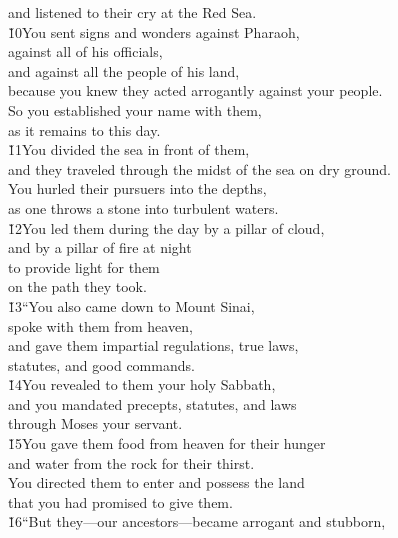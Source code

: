 \begin{poetry}
\poemll    and listened to their cry at the Red Sea. \\
\poeml \v{10}You sent signs and wonders against Pharaoh, \\
\poemll    against all of his officials, \\
\poeml and against all the people of his land, \\
\poemll    because you knew they acted arrogantly against your people. \\
\poeml So you established your name with them, \\
\poemll    as it remains to this day. \\
\poeml \v{11}You divided the sea in front of them, \\
\poemll    and they traveled through the midst of the sea on dry ground. \\
\poeml You hurled their pursuers into the depths, \\
\poemll    as one throws a stone into turbulent waters. \\
\poeml \v{12}You led them during the day by a pillar of cloud, \\
\poemll    and by a pillar of fire at night \\
\poeml to provide light for them \\
\poemll    on the path they took. \\
\poeml \v{13}``You also came down to Mount Sinai, \\
\poemll    spoke with them from heaven, \\
\poeml and gave them impartial regulations, true laws, \\
\poemll    statutes, and good commands. \\
\poeml \v{14}You revealed to them your holy Sabbath, \\
\poemll    and you mandated precepts, statutes, and laws \\
\poemlll       through Moses your servant. \\
\poeml \v{15}You gave them food from heaven for their hunger \\
\poemll    and water from the rock for their thirst. \\
\poeml You directed them to enter and possess the land \\
\poemll    that you had promised to give them. \\
\poeml \v{16}``But they---our ancestors---became arrogant and stubborn, \\

\end{poetry}
